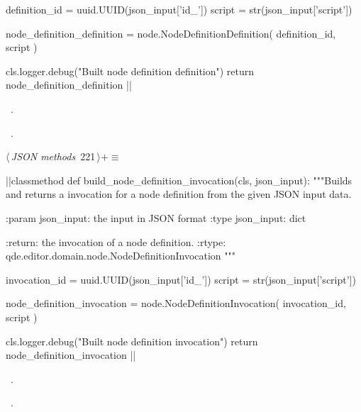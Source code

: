 \documentclass[%
    a4paper,    %
    justified,  %
    nobib,      %
    openany     %
]{tufte-book}
\makeatletter
\renewcommand{\label}[1]{\@tufte@label{##1}}%
\makeatother
\begin{document}
\begin{fullwidth}
\begin{flushleft}
\begin{minipage}{\linewidth}
\begin{pythoncode}
    definition_id = uuid.UUID(json_input['id_'])
    script        = str(json_input['script'])

    node_definition_definition = node.NodeDefinitionDefinition(
        definition_id,
        script
    )

    cls.logger.debug("Built node definition definition")
    return node_definition_definition
|\NWsep|
\end{pythoncode}
\vspace{1.5ex}
\footnotesize
\begin{list}{}{\setlength{\itemsep}{-\parsep}\setlength{\itemindent}{-\leftmargin}}
\item \NWtxtMacroDefBy\ .
\item \NWtxtMacroRefIn\ .

\item{}
\end{list}
\end{minipage}\vspace{4ex}
\end{flushleft}
\begin{flushleft} \small
\begin{minipage}{\linewidth}\label{scrap226}\raggedright\small
{} $\langle\,${\itshape JSON methods}\nobreak\ {\footnotesize {221}}$\,\rangle+\equiv$
\vspace{-1ex}
\begin{pythoncode}
|\normalfont{}\fontfamily{}|classmethod
def build_node_definition_invocation(cls, json_input):
    """Builds and returns a invocation for a node definition from the given
    JSON input data.

    :param json_input: the input in JSON format
    :type  json_input: dict

    :return: the invocation of a node definition.
    :rtype:  qde.editor.domain.node.NodeDefinitionInvocation
    """

    invocation_id = uuid.UUID(json_input['id_'])
    script        = str(json_input['script'])

    node_definition_invocation = node.NodeDefinitionInvocation(
        invocation_id,
        script
    )

    cls.logger.debug("Built node definition invocation")
    return node_definition_invocation
|\NWsep|
\end{pythoncode}
\vspace{1.5ex}
\footnotesize
\begin{list}{}{\setlength{\itemsep}{-\parsep}\setlength{\itemindent}{-\leftmargin}}
\item \NWtxtMacroDefBy\ .
\item \NWtxtMacroRefIn\ .


\end{list}
\end{minipage}
\end{flushleft}
\end{fullwidth}
\end{document}
